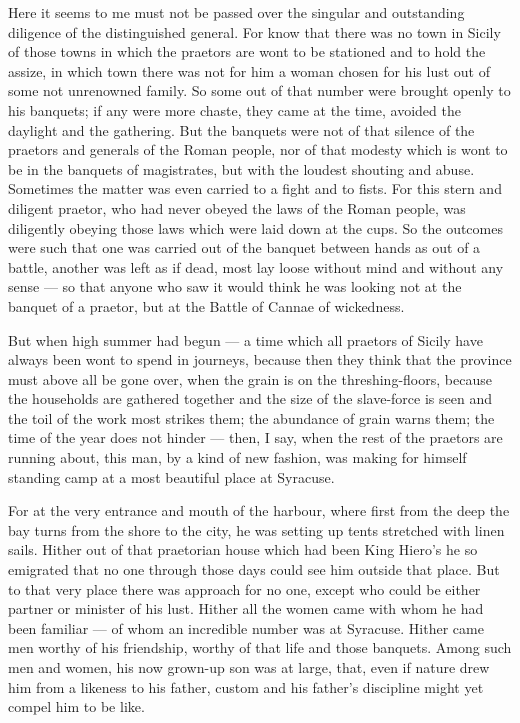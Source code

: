  Here it seems to me must not be passed over the singular and outstanding diligence of the distinguished general. For know that there was no town in Sicily of those towns in which the praetors are wont to be stationed and to hold the assize, in which town there was not for him a woman chosen for his lust out of some not unrenowned family. So some out of that number were brought openly to his banquets; if any were more chaste, they came at the time, avoided the daylight and the gathering. But the banquets were not of that silence of the praetors and generals of the Roman people, nor of that modesty which is wont to be in the banquets of magistrates, but with the loudest shouting and abuse. Sometimes the matter was even carried to a fight and to fists. For this stern and diligent praetor, who had never obeyed the laws of the Roman people, was diligently obeying those laws which were laid down at the cups. So the outcomes were such that one was carried out of the banquet between hands as out of a battle, another was left as if dead, most lay loose without mind and without any sense --- so that anyone who saw it would think he was looking not at the banquet of a praetor, but at the Battle of Cannae of wickedness.

 But when high summer had begun --- a time which all praetors of Sicily have always been wont to spend in journeys, because then they think that the province must above all be gone over, when the grain is on the threshing-floors, because the households are gathered together and the size of the slave-force is seen and the toil of the work most strikes them; the abundance of grain warns them; the time of the year does not hinder --- then, I say, when the rest of the praetors are running about, this man, by a kind of new fashion, was making for himself standing camp at a most beautiful place at Syracuse.

 For at the very entrance and mouth of the harbour, where first from the deep the bay turns from the shore to the city, he was setting up tents stretched with linen sails. Hither out of that praetorian house which had been King Hiero's he so emigrated that no one through those days could see him outside that place. But to that very place there was approach for no one, except who could be either partner or minister of his lust. Hither all the women came with whom he had been familiar --- of whom an incredible number was at Syracuse. Hither came men worthy of his friendship, worthy of that life and those banquets. Among such men and women, his now grown-up son was at large, that, even if nature drew him from a likeness to his father, custom and his father's discipline might yet compel him to be like.

